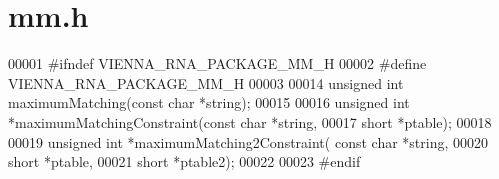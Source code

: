 \hypertarget{mm_8h_source}{}\section{mm.\+h}
\label{mm_8h_source}

\begin{DoxyCode}
00001 \textcolor{preprocessor}{#ifndef VIENNA\_RNA\_PACKAGE\_MM\_H}
00002 \textcolor{preprocessor}{#define VIENNA\_RNA\_PACKAGE\_MM\_H}
00003 
00014 \textcolor{keywordtype}{unsigned} \textcolor{keywordtype}{int}  maximumMatching(\textcolor{keyword}{const} \textcolor{keywordtype}{char} *\textcolor{keywordtype}{string});
00015 
00016 \textcolor{keywordtype}{unsigned} \textcolor{keywordtype}{int} *maximumMatchingConstraint(\textcolor{keyword}{const} \textcolor{keywordtype}{char} *\textcolor{keywordtype}{string},
00017                                         \textcolor{keywordtype}{short} *ptable);
00018 
00019 \textcolor{keywordtype}{unsigned} \textcolor{keywordtype}{int} *maximumMatching2Constraint( \textcolor{keyword}{const} \textcolor{keywordtype}{char} *\textcolor{keywordtype}{string},
00020                                           \textcolor{keywordtype}{short} *ptable,
00021                                           \textcolor{keywordtype}{short} *ptable2);
00022 
00023 \textcolor{preprocessor}{#endif}
\end{DoxyCode}
